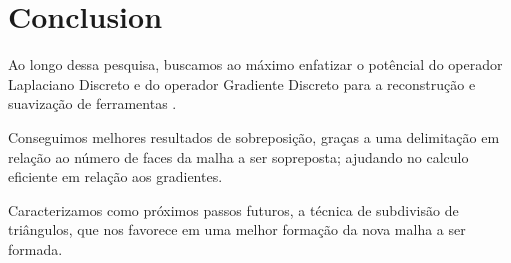 \section{Conclusion}
%

Ao longo dessa pesquisa, buscamos ao máximo enfatizar o potêncial do operador Laplaciano Discreto e do operador Gradiente Discreto para a reconstrução e suavização de ferramentas .

Conseguimos melhores resultados de sobreposição, graças a uma delimitação em relação ao número de faces da malha a ser sopreposta; ajudando no calculo eficiente em relação aos gradientes.

Caracterizamos como próximos passos futuros, a técnica de subdivisão de triângulos, que nos favorece em uma melhor formação da nova malha a ser formada.